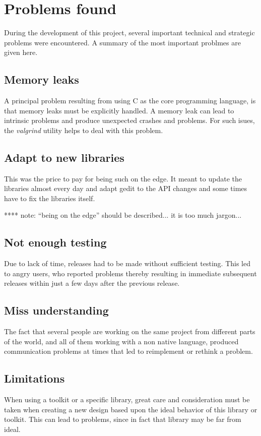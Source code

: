 \chapter{Problems found}

During the development of this project, several important technical and strategic problems were encountered. A summary of 
the most important problmes are given here. 

\section*{Memory leaks}

A principal problem resulting from using C as the core programming language, is that memory leaks must be explicitly handled. 
A memory leak can lead to intrinsic problems and produce unexpected crashes and problems. For such isues, the 
\emph{valgrind} utility helps to deal with this problem.

\section*{Adapt to new libraries}

This was the price to pay for being such on the edge. It meant to update the libraries almost every day and adapt gedit to the API changes and some times have to fix the libraries itself.

**** note:  ``being on the edge'' should be described... it is too much jargon...



\section*{Not enough testing}

Due to lack of time, releases had to be made without sufficient testing. This led to angry users, who reported problems thereby resulting 
in immediate subsequent releases within just a few days after the previous release.

\section*{Miss understanding}

The fact that several people are working on the same project from different parts of the world, and all of them working with a non 
native language, produced communication problems at times that led to reimplement or rethink a problem.

\section*{Limitations}

When using a toolkit or a specific library, great care and consideration must be taken when creating a new design 
based upon the ideal behavior of this library or toolkit.    This can lead to problems, since in fact that library 
may be far from ideal.
